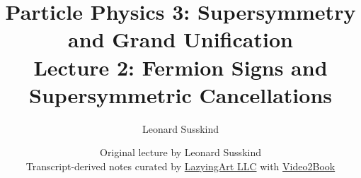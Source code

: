 \documentclass[11pt,oneside]{book}
\begin{document}
\frontmatter
\title{Particle Physics 3: Supersymmetry and Grand Unification\\[0.5em]
\large Lecture 2: Fermion Signs and Supersymmetric Cancellations}
\author{Leonard Susskind}
\date{Original lecture by Leonard Susskind\\[0.4em]
Transcript-derived notes curated by
\href{https://lazying.art}{LazyingArt LLC} with
\href{https://github.com/lachlanchen/Video2Book}{Video2Book}}
\maketitle
\mainmatter

\end{document}
